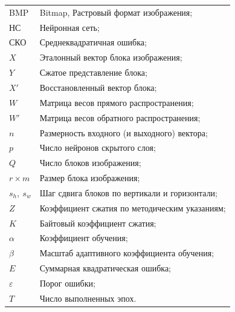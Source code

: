 
\noindent
\begin{tabular}{@{}p{2.6cm}@{\ \mdash\ }p{12.0cm}@{}}
BMP & Bitmap, Растровый формат изображения;\\
НС & Нейронная сеть;\\
СКО & Среднеквадратичная ошибка;\\
$X$ & Эталонный вектор блока изображения;\\
$Y$ & Сжатое представление блока;\\
$X'$ & Восстановленный вектор блока;\\
$W$ & Матрица весов прямого распространения;\\
$W'$ & Матрица весов обратного распространения;\\
$n$ & Размерность входного (и выходного) вектора;\\
$p$ & Число нейронов скрытого слоя;\\
$Q$ & Число блоков изображения;\\
$r \times m$ & Размер блока изображения;\\
$s_h,\ s_w$ & Шаг сдвига блоков по вертикали и горизонтали;\\
$Z$ & Коэффициент сжатия по методическим указаниям;\\
$K$ & Байтовый коэффициент сжатия;\\
$\alpha$ & Коэффициент обучения;\\
$\beta$ & Масштаб адаптивного коэффициента обучения;\\
$E$ & Суммарная квадратическая ошибка;\\
$\varepsilon$ & Порог ошибки;\\
$T$ & Число выполненных эпох.
\end{tabular}

